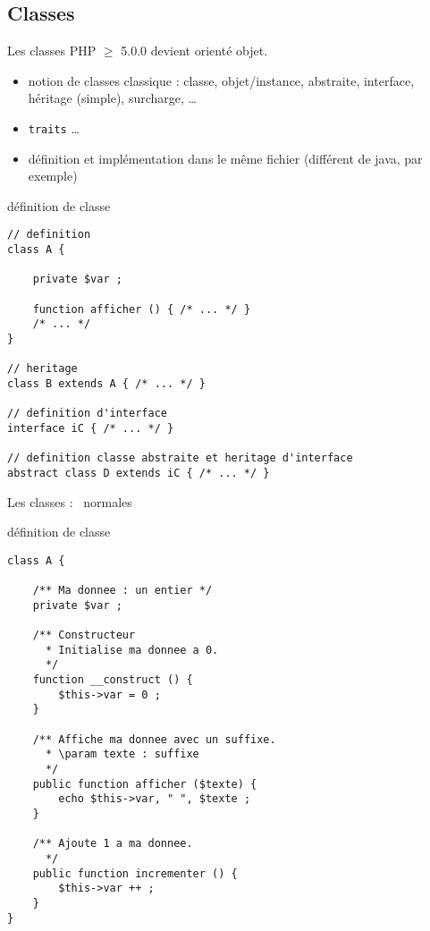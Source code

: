 \subsection{Classes}

\begin{frame}[containsverbatim]{Les classes}
PHP $\ge$ 5.0.0 devient orienté objet.
\begin{itemize}
\item notion de classes classique : classe, objet/instance, abstraite, interface, héritage (simple), surcharge, \ldots
\item \texttt{traits} \ldots
\item définition et implémentation dans le même fichier (différent de java, par exemple)
\end{itemize}
\begin{block}{définition de classe}
\begin{lstlisting}
// definition
class A {

	private $var ;

	function afficher () { /* ... */ } 
	/* ... */
} 

// heritage
class B extends A { /* ... */ } 

// definition d'interface
interface iC { /* ... */ } 

// definition classe abstraite et heritage d'interface
abstract class D extends iC { /* ... */ } 
\end{lstlisting}
\end{block}
\end{frame}

\begin{frame}[containsverbatim]{Les classes : \guillemotleft~normales~\guillemotright}
\begin{block}{définition de classe}
\begin{lstlisting}
class A {

	/** Ma donnee : un entier */
	private $var ;

	/** Constructeur
	  * Initialise ma donnee a 0.
	  */
	function __construct () {
		$this->var = 0 ;
	} 
	
	/** Affiche ma donnee avec un suffixe.
	  * \param texte : suffixe
	  */
	public function afficher ($texte) {
		echo $this->var, " ", $texte ;
	}
	
	/** Ajoute 1 a ma donnee.
	  */
	public function incrementer () {
		$this->var ++ ;
	} 
} 
\end{lstlisting}
\end{block}
\end{frame}

